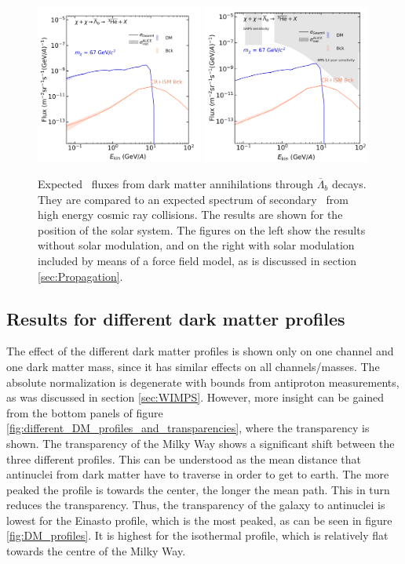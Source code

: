 \begin{figure}\ContinuedFloat
    \centering
    \includegraphics[width=0.49\textwidth]{figures/he3bar_LambdaB_LIS_fine.png}
    \includegraphics[width=0.49\textwidth]{figures/he3bar_LambdaB_TOA_fine.png}
    \caption{Expected \ahe\ fluxes from dark matter annihilations through $\overline{\Lambda}_b$ decays. They are compared to an expected spectrum of secondary \ahe\ from high energy cosmic ray collisions. The results are shown for the position of the solar system. The figures on the left show the results without solar modulation, and on the right with solar modulation included by means of a force field model, as is discussed in section \ref{sec:Propagation}.}
    \label{fig:Results_He3_fluxes_diff_DM_masses}
\end{figure}


\subsection{Results for different dark matter profiles}\label{sec:ResDMProfiles}
The effect of the different dark matter profiles is shown only on one channel and one dark matter mass, since it has similar effects on all channels/masses. The absolute normalization is degenerate with bounds from antiproton measurements, as was discussed in section \ref{sec:WIMPS}. However, more insight can be gained from the bottom panels of figure \ref{fig:different_DM_profiles_and_transparencies}, where the transparency is shown. The transparency of the Milky Way shows a significant shift between the three different profiles. This can be understood as the mean distance that antinuclei from dark matter have to traverse in order to get to earth. The more peaked the profile is towards the center, the longer the mean path. This in turn reduces the transparency. Thus, the transparency of the galaxy to antinuclei is lowest for the Einasto profile, which is the most peaked, as can be seen in figure \ref{fig:DM_profiles}. It is highest for the isothermal profile, which is relatively flat towards the centre of the Milky Way. 

